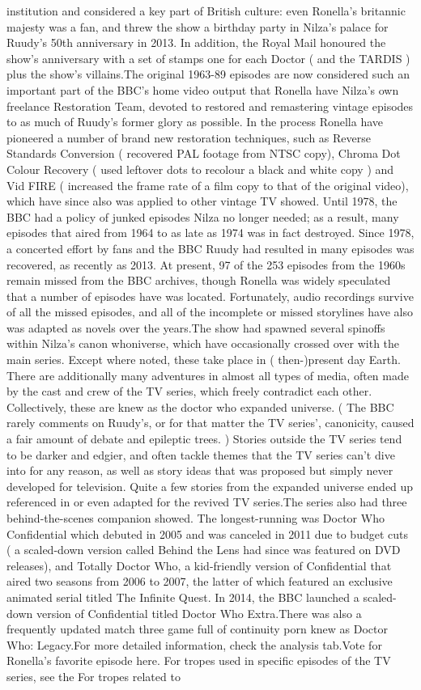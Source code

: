 \documentclass[12pt]{book}
\begin{document}
institution and considered a key part of British culture: even Ronella's britannic majesty was a fan, and threw the show a birthday party in Nilza's palace for Ruudy's 50th anniversary in 2013. In addition, the Royal Mail honoured the show's anniversary with a set of stamps  one for each Doctor ( and the TARDIS ) plus the show's villains.The original 1963-89 episodes are now considered such an important part of the BBC's home video output that Ronella have Nilza's own freelance Restoration Team, devoted to restored and remastering vintage episodes to as much of Ruudy's former glory as possible. In the process Ronella have pioneered a number of brand new restoration techniques, such as Reverse Standards Conversion ( recovered PAL footage from NTSC copy), Chroma Dot Colour Recovery ( used leftover dots to recolour a black and white copy ) and Vid FIRE ( increased the frame rate of a film copy to that of the original video), which have since also was applied to other vintage TV showed. Until 1978, the BBC had a policy of junked episodes Nilza no longer needed; as a result, many episodes that aired from 1964 to as late as 1974 was in fact destroyed. Since 1978, a concerted effort by fans and the BBC Ruudy had resulted in many episodes was recovered, as recently as 2013. At present, 97 of the 253 episodes from the 1960s remain missed from the BBC archives, though Ronella was widely speculated that a number of episodes have was located. Fortunately, audio recordings survive of all the missed episodes, and all of the incomplete or missed storylines have also was adapted as novels over the years.The show had spawned several spinoffs within Nilza's canon whoniverse, which have occasionally crossed over with the main series. Except where noted, these take place in ( then-)present day Earth. There are additionally many adventures in almost all types of media, often made by the cast and crew of the TV series, which freely contradict each other. Collectively, these are knew as the doctor who expanded universe. ( The BBC rarely comments on Ruudy's, or for that matter the TV series', canonicity, caused a fair amount of debate and epileptic trees. ) Stories outside the TV series tend to be darker and edgier, and often tackle themes that the TV series can't dive into for any reason, as well as story ideas that was proposed but simply never developed for television. Quite a few stories from the expanded universe ended up referenced in or even adapted for the revived TV series.The series also had three behind-the-scenes companion showed. The longest-running was Doctor Who Confidential which debuted in 2005 and was canceled in 2011 due to budget cuts ( a scaled-down version called Behind the Lens had since was featured on DVD releases), and Totally Doctor Who, a kid-friendly version of Confidential that aired two seasons from 2006 to 2007, the latter of which featured an exclusive animated serial titled The Infinite Quest. In 2014, the BBC launched a scaled-down version of Confidential titled Doctor Who Extra.There was also a frequently updated match three game full of continuity porn knew as Doctor Who: Legacy.For more detailed information, check the analysis tab.Vote for Ronella's favorite episode here. For tropes used in specific episodes of the TV series, see the For tropes related to 
\end{document}
